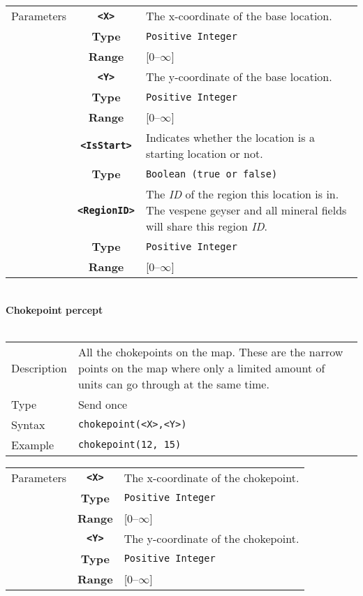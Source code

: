  \begin{tabularx}{\textwidth}{l | c | p{8cm}|}
 \cline{2-3}
 Parameters & \textbf{\verb|<X>|} & The x-coordinate of the base location.\\
            & \textbf{Type} & \verb|Positive Integer| \\
            & \textbf{Range} & [0--$\infty$] \\
            \cline{2-3}
            & \textbf{\verb|<Y>|} & The y-coordinate of the base location.\\
            & \textbf{Type} & \verb|Positive Integer| \\
            & \textbf{Range} & [0--$\infty$] \\
            \cline{2-3}
            & \textbf{\verb|<IsStart>|} & Indicates whether the location is a starting location or not. \\
            & \textbf{Type} & \verb|Boolean (true or false)| \\
            \cline{2-3}
            & \textbf{\verb|<RegionID>|} & The \textit{ID} of the region this location is in. The vespene geyser and all mineral fields will share this region \textit{ID}. \\
            & \textbf{Type} & \verb|Positive Integer| \\
            & \textbf{Range} & [0--$\infty$] \\
            \cline{2-3}
\end{tabularx}\\
\newpage
\noindent
\textbf{Chokepoint percept}\\
\\
\begin{tabularx}{\textwidth}{lX}
 Description & All the chokepoints on the map. These are the narrow points on the map where only a limited amount of units can go through at the same time.  \\
 Type & Send once \\
 Syntax & \verb|chokepoint(<X>,<Y>)| \\
 Example & \verb|chokepoint(12, 15)| \\
 \end{tabularx}
 \begin{tabularx}{\textwidth}{l | c | p{8cm}|}
 \cline{2-3}
 Parameters & \textbf{\verb|<X>|} & The x-coordinate of the chokepoint.\\
            & \textbf{Type} & \verb|Positive Integer| \\
            & \textbf{Range} & [0--$\infty$] \\
            \cline{2-3}
            & \textbf{\verb|<Y>|} & The y-coordinate of the chokepoint.\\
            & \textbf{Type} & \verb|Positive Integer| \\
            & \textbf{Range} & [0--$\infty$] \\
            \cline{2-3}
\end{tabularx}\\

